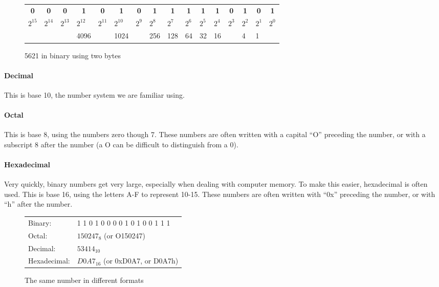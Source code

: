 \documentclass[letter,11pt]{article}
\newcommand*{\thead}[1]{\multicolumn{1}{c}{\bfseries #1}}
\begin{document}
\begin{figure}[h!]
    \centering
    \begin{tabular}{ l l l l l l l l| l l l l l l l l }
        \thead{0} & \thead{0} & \thead{0} & \thead{1} & \thead{0} & \thead{1} & \thead{0} & \thead{1} & \thead{1} & \thead{1} & \thead{1} & \thead{1} & \thead{0} & \thead{1} & \thead{0} & \thead{1} \\
        $2^{15}$ & $2^{14}$ & $2^{13}$ & $2^{12}$ & $2^{11}$ & $2^{10}$ & $2^9$ & $2^8$ & $2^7$ & $2^6$ & $2^5$ & $2^4$ & $2^3$ & $2^2$ & $2^1$ & $2^0$ \\
        & & & 4096 & & 1024 & & 256 & 128 & 64 & 32 & 16 & & 4 & 1
    \end{tabular}
    \caption{5621 in binary using two bytes}
    \label{fig:binarychart}
\end{figure}

\paragraph{Decimal}This is base 10, the number system we are familiar using.

\paragraph{Octal}This is base 8, using the numbers zero though 7. These numbers are often written with a capital ``O'' preceding the number, or with a subscript 8 after the number (a O can be difficult to distinguish from a 0).

\paragraph{Hexadecimal}Very quickly, binary numbers get very large, especially when dealing with computer memory. To make this easier, hexadecimal is often used. This is base 16, using the letters A-F to represent 10-15. These numbers are often written with ``0x'' preceding the number, or with ``h'' after the number.

\begin{figure}[h!]
    \centering
    \begin{tabular}{l l}
         Binary:      & 1 1 0 1 0 0 0 0 1 0 1 0 0 1 1 1  \\
         Octal:       & $150247_8$ (or O150247) \\
         Decimal:     & $53414_{10}$ \\
         Hexadecimal: & $D0A7_{16}$ (or 0xD0A7, or D0A7h)
    \end{tabular}
    \caption{The same number in different formats}
    \label{fig:datatypesequivalent}
\end{figure}
\end{document}

